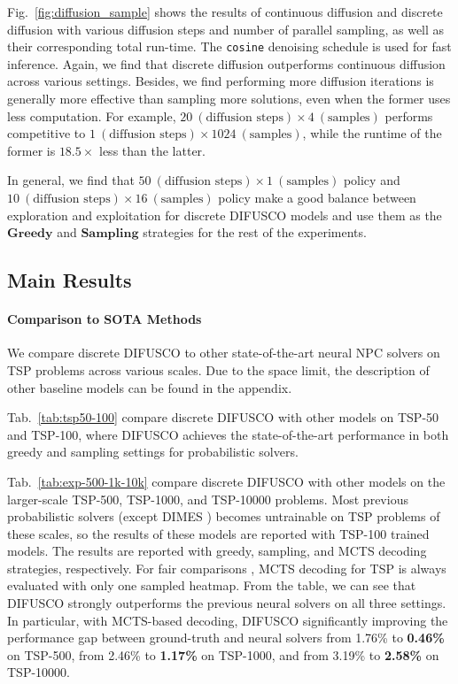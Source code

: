\documentclass{article}
\theoremstyle{plain}
\theoremstyle{definition}
\theoremstyle{remark}
\newcommand{\method}{DIFUSCO}
\begin{document}
Fig.~\ref{fig:diffusion_sample} shows the results of continuous diffusion and discrete diffusion with various diffusion steps and number of parallel sampling, as well as their corresponding total run-time. The \texttt{cosine} denoising schedule is used for fast inference. Again, we find that discrete diffusion outperforms continuous diffusion across various settings. Besides, we find performing more diffusion iterations is generally more effective than sampling more solutions, even when the former uses less computation. For example, $20\ (\text{diffusion steps}) \times 4 
\ (\text{samples})$ performs competitive to $1\ (\text{diffusion steps}) \times 1024\ (\text{samples})$, while the runtime of the former is $18.5\times$ less than the latter.

In general, we find that $50\ (\text{diffusion steps}) \times 1\ (\text{samples})$ policy and $10\ (\text{diffusion steps}) \times 16\ (\text{samples})$ policy make a good balance between exploration and exploitation for discrete \method{} models and use them as the $\textbf{Greedy}$ and $\textbf{Sampling}$ strategies for the rest of the experiments.

\subsection{Main Results}
\paragraph{Comparison to SOTA Methods}

We compare discrete \method{} to other state-of-the-art neural NPC solvers on TSP problems across various scales. Due to the space limit, the description of other baseline models can be found in the appendix.

Tab.~\ref{tab:tsp50-100} compare discrete \method{} with other models on TSP-50 and TSP-100, where \method{} achieves the state-of-the-art performance in both greedy and sampling settings for probabilistic solvers.

Tab.~\ref{tab:exp-500-1k-10k} compare discrete \method{} with other models on the larger-scale TSP-500, TSP-1000, and TSP-10000 problems. Most previous probabilistic solvers (except DIMES \citep{qiudimes}) becomes untrainable on TSP problems of these scales, so the results of these models are reported with TSP-100 trained models. The results are reported with greedy, sampling, and MCTS decoding strategies, respectively.  For fair comparisons \citep{fu2021generalize,qiudimes}, MCTS decoding for TSP is always evaluated with only one sampled heatmap. From the table, we can see that \method{} strongly outperforms the previous neural solvers on all three settings. In particular, with MCTS-based decoding, \method{} significantly improving the performance gap between ground-truth and neural solvers from 1.76\% to \textbf{0.46\%} on TSP-500, from 2.46\% to \textbf{1.17\%} on TSP-1000, and from 3.19\% to \textbf{2.58\%} on TSP-10000.
\end{document}
